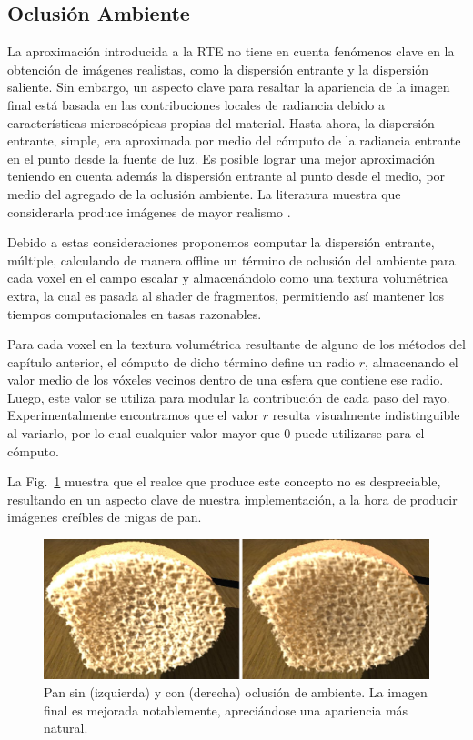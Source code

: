 \subsection{Oclusión Ambiente}

La aproximación introducida a la RTE no tiene en cuenta fenómenos clave en la obtención de imágenes realistas, como la dispersión entrante y la dispersión saliente.
Sin embargo, un aspecto clave para resaltar la apariencia de la imagen final está basada en las contribuciones locales de radiancia debido a características microscópicas propias del material.
Hasta ahora, la dispersión entrante, simple, era aproximada por medio del cómputo de la radiancia entrante en el punto desde la fuente de luz.
Es posible lograr una mejor aproximación teniendo en cuenta además la dispersión entrante al punto desde el medio, por medio del agregado de la oclusión ambiente.
La literatura muestra que considerarla produce imágenes de mayor realismo \cite{Hernell2010}.

Debido a estas consideraciones proponemos computar la dispersión entrante, múltiple, calculando de manera offline un término de oclusión del ambiente para cada voxel en el campo escalar y almacenándolo como una textura volumétrica extra, la cual es pasada al shader de fragmentos, permitiendo así mantener los tiempos computacionales en tasas razonables.

Para cada voxel en la textura volumétrica resultante de alguno de los métodos del capítulo anterior, el cómputo de dicho término define un radio $r$, almacenando el valor medio de los vóxeles vecinos dentro de una esfera que contiene ese radio.
Luego, este valor se utiliza para modular la contribución de cada paso del rayo.
Experimentalmente encontramos que el valor $r$ resulta visualmente indistinguible al variarlo, por lo cual cualquier valor mayor que $0$ puede utilizarse para el cómputo.

La Fig.~\ref{fg:occlusion} muestra que el realce que produce este concepto no es despreciable, resultando en un aspecto clave de nuestra implementación, a la hora de producir imágenes creíbles de migas de pan. 



\begin{figure}
\centerline{\includegraphics[width=13cm]{figures/occlusion}}
  \caption[Pan renderizado sin y con oclusión de ambiente]{Pan sin (izquierda) y con (derecha) oclusión de ambiente. La imagen final es mejorada notablemente, apreciándose una apariencia más natural.}
  \label{fg:occlusion}
\end{figure}
 
